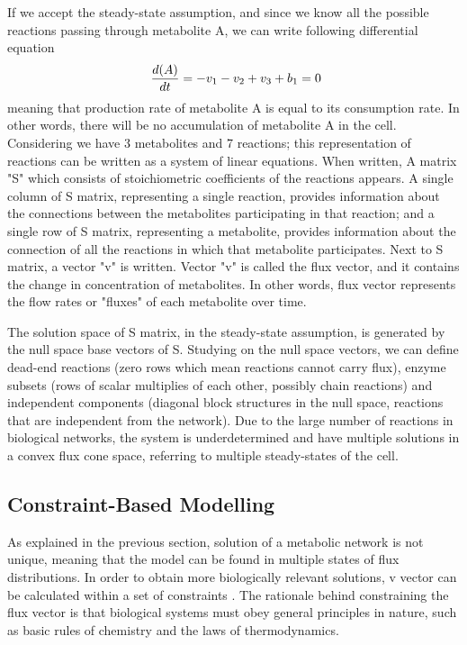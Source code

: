 If we accept the steady-state assumption, and since we know all the possible reactions passing through metabolite A, we can write following differential equation
\begin{equation}
 \ \frac{d(A)}{dt} = - v_1 - v_2 + v_3 + b_1 = 0 \\
\end{equation}
meaning that production rate of metabolite A is equal to its consumption rate. In other words, there will be no accumulation of metabolite A in the cell. Considering we have 3 metabolites and 7 reactions; this representation of reactions can be written as a system of linear equations. When written, A matrix "S" which consists of stoichiometric coefficients of the reactions appears. A single column of S matrix, representing a single reaction, provides information about the connections between the metabolites participating in that reaction; and a single row of S matrix, representing a metabolite, provides information about the connection of all the reactions in which that metabolite participates. Next to S matrix, a vector "v" is written. Vector "v" is called the flux vector, and it contains the change in concentration of metabolites. In other words, flux vector represents the flow rates or "fluxes" of each metabolite over time.

The solution space of S matrix, in the steady-state assumption, is generated by the null space base vectors of S. Studying on the null space vectors, we can define dead-end reactions (zero rows which mean reactions cannot carry flux), enzyme subsets (rows of scalar multiplies of each other, possibly chain reactions) and independent components (diagonal block structures in the null space, reactions that are independent from the network). Due to the large number of reactions in biological networks, the system is underdetermined and have multiple solutions in a convex flux cone space, referring to multiple steady-states of the cell.

\subsection{Constraint-Based Modelling}
As explained in the previous section, solution of a metabolic network is not unique, meaning that the model can be found in multiple states of flux distributions. In order to obtain more biologically relevant solutions, v vector can be calculated within a set of constraints \cite{thiele2007bringing}. The rationale behind constraining the flux vector is that biological systems must obey general principles in nature, such as basic rules of chemistry and the laws of thermodynamics.

